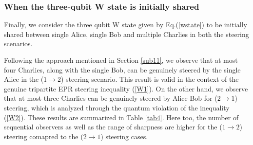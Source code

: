 \documentclass[pra,a4paper,aps,twocolumn,showpacs,superscriptaddress,groupedaddress]{revtex4}
\begin{document}
\subsubsection{When the three-qubit W state is initially shared}
Finally, we consider the three qubit W state given by Eq.(\ref{wstate}) to be initially shared between single Alice, single Bob and multiple Charlies in both the steering scenarios.

 Following the approach mentioned in Section \ref{sub11}, we observe that at most four Charlies, along with the single Bob, can be genuinely steered by the single Alice in the ($1 \rightarrow 2$) steering scenario. This result is valid in the context of the genuine tripartite EPR steering inequality (\ref{W1}). On the other hand, we  observe that at most three Charlies can be genuinely steered by Alice-Bob for ($2 \rightarrow 1$) steering, which is analyzed through the quantum violation of the inequality (\ref{W2}). These results are summarized in Table \ref{tab4}. Here too, the number of sequential observers as well as the range of sharpness are higher for the ($1 \rightarrow 2$) steering comapred to the ($2 \rightarrow 1$) steering cases.

\end{document}
